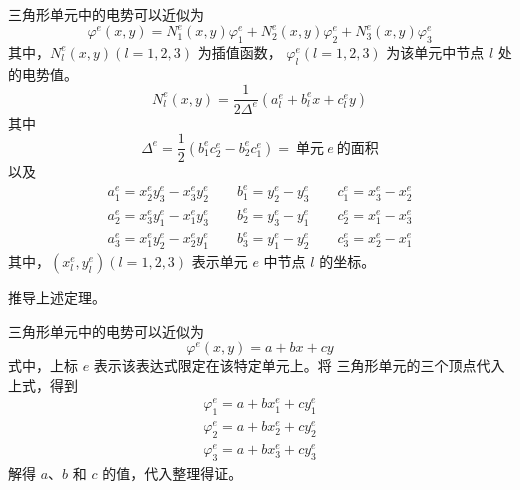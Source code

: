 \begin{theorem}
    三角形单元中的电势可以近似为
    \begin{equation}
        \varphi^e(x,y)=N_1^e(x,y)\varphi_1^e
        +N_2^e(x,y)\varphi_2^e
        +N_3^e(x,y)\varphi_3^e
    \end{equation}
    其中，$N_l^e(x,y)(l=1,2,3)$ 为插值函数，
    $\varphi_l^e(l=1,2,3)$ 为该单元中节点 $l$ 处的电势值。
    \begin{equation}
        N_l^e(x,y)=\frac{1}{2\Delta^e}
        (a_l^e+ b_l^ex+c_l^ey)
    \end{equation}
    其中
    \begin{equation}
        \Delta^e=\frac{1}{2}
        (b_1^ec_2^e-b_2^ec_1^e)
        =\ \text{单元}\ e\ \text{的面积}
    \end{equation}
    以及
    \begin{equation}
        \begin{gathered}
            a_1^e=x_2^ey_3^e-x_3^ey_2^e
            \qquad b_1^e=y_2^e-y_3^e
            \qquad c_1^e=x_3^e-x_2^e\\
            a_2^e=x_3^ey_1^e-x_1^ey_3^e
            \qquad b_2^e=y_3^e-y_1^e
            \qquad c_2^e=x_1^e-x_3^e\\
            a_3^e=x_1^ey_2^e-x_2^ey_1^e
            \qquad b_3^e=y_1^e-y_2^e
            \qquad c_3^e=x_2^e-x_1^e
        \end{gathered}
    \end{equation}
    其中，$(x_l^e,y_l^e)(l=1,2,3)$ 表示单元 $e$ 中节点 $l$ 的坐标。
\end{theorem}

\begin{exercise}
    推导上述定理。
\end{exercise}

\begin{solution}
    三角形单元中的电势可以近似为
    \begin{equation*}
        \varphi^e(x,y)=a+bx+cy
    \end{equation*}
    式中，上标 $e$ 表示该表达式限定在该特定单元上。将
    三角形单元的三个顶点代入上式，得到
    \begin{gather*}
        \varphi_1^e=a+bx_1^e+cy_1^e\\
        \varphi_2^e=a+bx_2^e+cy_2^e\\
        \varphi_3^e=a+bx_3^e+cy_3^e
    \end{gather*}
    解得 $a$、$b$ 和 $c$ 的值，代入整理得证。
\end{solution}

